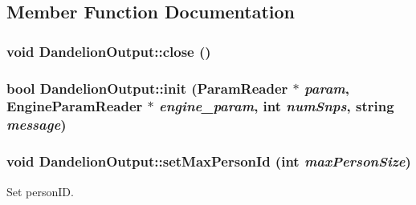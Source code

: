 \subsection{Member Function Documentation}
\hypertarget{classDandelionOutput_a4688c66f48f4db8c01248707e40ceef2}{
\subsubsection[{close}]{\setlength{\rightskip}{0pt plus 5cm}void DandelionOutput::close ()}}
\label{classDandelionOutput_a4688c66f48f4db8c01248707e40ceef2}
\hypertarget{classDandelionOutput_a93338e6f99505f5d261edac17a7199e4}{
\subsubsection[{init}]{\setlength{\rightskip}{0pt plus 5cm}bool DandelionOutput::init ({\bf ParamReader} $\ast$ {\em param}, \/  {\bf EngineParamReader} $\ast$ {\em engine\_\-param}, \/  int {\em numSnps}, \/  string {\em message})}}
\label{classDandelionOutput_a93338e6f99505f5d261edac17a7199e4}
\hypertarget{classDandelionOutput_aef3d333c031d511dabfff9235b04566d}{
\subsubsection[{setMaxPersonId}]{\setlength{\rightskip}{0pt plus 5cm}void DandelionOutput::setMaxPersonId (int {\em maxPersonSize})}}
\label{classDandelionOutput_aef3d333c031d511dabfff9235b04566d}
Set personID.


